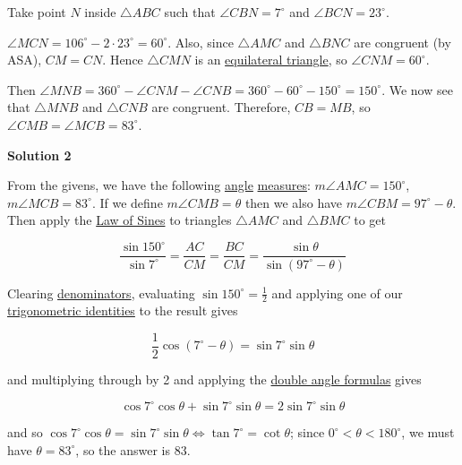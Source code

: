 \begin{enumerate}
 Take point $N$ inside $\triangle ABC$ such that $\angle CBN = 7^\circ$ and $\angle BCN = 23^\circ$.

 $\angle MCN = 106^\circ - 2\cdot 23^\circ = 60^\circ$. Also, since $\triangle AMC$ and $\triangle BNC$ are congruent (by ASA), $CM = CN$. Hence $\triangle CMN$ is an \href{https://artofproblemsolving.com/wiki/index.php?title=Equilateral\_triangle}{equilateral triangle}, so $\angle CNM = 60^\circ$.

 Then $\angle MNB = 360^\circ - \angle CNM - \angle CNB = 360^\circ - 60^\circ - 150^\circ = 150^\circ$. We now see that $\triangle MNB$ and $\triangle CNB$ are congruent. Therefore, $CB = MB$, so $\angle CMB = \angle MCB = \boxed{83^\circ}$.

 



\textbf{Solution 2}

From the givens, we have the following \href{https://artofproblemsolving.com/wiki/index.php?title=Angle}{angle} \href{https://artofproblemsolving.com/wiki/index.php?title=Measure}{measures}: $m\angle AMC = 150^\circ$, $m\angle MCB = 83^\circ$.  If we define $m\angle CMB = \theta$ then we also have $m\angle CBM = 97^\circ - \theta$.  Then apply the \href{https://artofproblemsolving.com/wiki/index.php?title=Law\_of\_Sines}{Law of Sines} to triangles $\triangle AMC$ and $\triangle BMC$ to get

 
 \[\frac{\sin 150^\circ}{\sin 7^\circ} = \frac{AC}{CM} = \frac{BC}{CM} = \frac{\sin \theta}{\sin (97^\circ - \theta)}\]

 Clearing \href{https://artofproblemsolving.com/wiki/index.php?title=Denominator}{denominators}, evaluating $\sin 150^\circ = \frac 12$ and applying one of our \href{https://artofproblemsolving.com/wiki/index.php?title=Trigonometric\_identities}{trigonometric identities} to the result gives

 
 \[\frac{1}{2} \cos (7^\circ - \theta )= \sin 7^\circ \sin \theta\]

 and multiplying through by 2 and applying the \href{https://artofproblemsolving.com/wiki/index.php/Trigonometric\_identities\#Double-angle\_identities\%7C}{double angle formulas} gives

 
 \[\cos 7^\circ\cos\theta + \sin7^\circ\sin\theta = 2 \sin7^\circ \sin\theta\]

 and so $\cos 7^\circ \cos \theta = \sin 7^\circ \sin\theta \Longleftrightarrow \tan 7^{\circ} = \cot \theta$; since $0^\circ < \theta < 180^\circ$, we must have $\theta = 83^\circ$, so the answer is $\boxed{83}$.


\end{enumerate}
